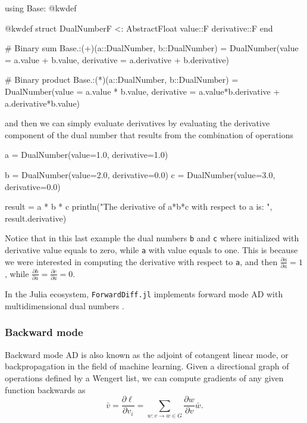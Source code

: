 \begin{jllisting}
using Base: @kwdef

@kwdef struct DualNumber{F <: AbstractFloat}
    value::F
    derivative::F
end

# Binary sum
Base.:(+)(a::DualNumber, b::DualNumber) = DualNumber(value = a.value + b.value, derivative = a.derivative + b.derivative)

# Binary product 
Base.:(*)(a::DualNumber, b::DualNumber) = DualNumber(value = a.value * b.value, derivative = a.value*b.derivative + a.derivative*b.value)
\end{jllisting}
and then we can simply evaluate derivatives by evaluating the derivative component of the dual number that results from the combination of operations
\begin{jllisting}
a = DualNumber(value=1.0, derivative=1.0)

b = DualNumber(value=2.0, derivative=0.0)
c = DualNumber(value=3.0, derivative=0.0)

result = a * b * c
println("The derivative of a*b*c with respect to a is: ", result.derivative)
\end{jllisting}
Notice that in this last example the dual numbers \texttt{b} and \texttt{c} where initialized with derivative value equals to zero, while \texttt{a} with value equals to one. 
This is because we were interested in computing the derivative with respect to \texttt{a}, and then $\frac{\partial a}{\partial a} = 1$, while $\frac{\partial b}{\partial a} = \frac{\partial c}{\partial a} = 0$. 

In the Julia ecosystem, \texttt{ForwardDiff.jl} implements forward mode AD with multidimensional dual numbers \cite{RevelsLubinPapamarkou2016}.

\subsubsection{Backward mode}

Backward mode AD is also known as the adjoint of cotangent linear mode, or backpropagation in the field of machine learning. Given a directional graph of operations defined by a Wengert list, we can compute gradients of any given function backwards as
\begin{equation}
 \bar v = \frac{\partial \ell}{\partial v_i}= \sum_{w : v \rightarrow w \in G} \frac{\partial w}{\partial v} \bar{w}.
\end{equation}

